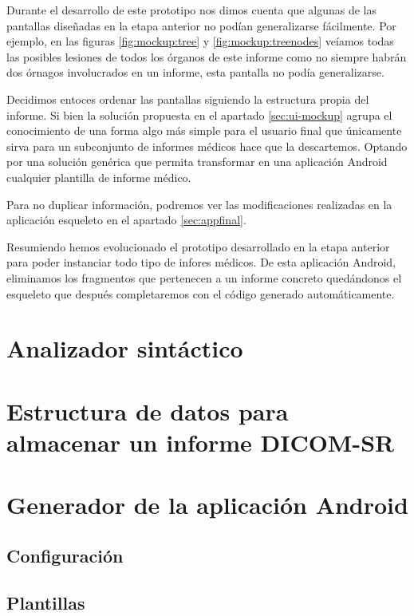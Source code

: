 Durante el desarrollo de este prototipo nos dimos cuenta que algunas de las pantallas diseñadas en la etapa anterior no podían generalizarse fácilmente. Por ejemplo, en las figuras  \ref{fig:mockup:tree} y \ref{fig:mockup:treenodes}  veíamos todas las posibles lesiones de todos los órganos de este informe como no siempre habrán dos órnagos involucrados en un informe, esta pantalla no podía generalizarse.\par
Decidimos entoces ordenar las pantallas siguiendo la estructura propia del informe. Si bien la solución propuesta en el apartado \ref{sec:ui-mockup} agrupa el conocimiento de una forma algo más simple para el usuario final que únicamente sirva para un subconjunto de informes médicos hace que la descartemos. Optando por una solución genérica que permita transformar en una aplicación Android cualquier plantilla de informe médico.\medskip\par  

Para no duplicar información, podremos ver las modificaciones realizadas en la aplicación esqueleto en el apartado \ref{sec:appfinal}.\par
Resumiendo hemos evolucionado el prototipo desarrollado en la etapa anterior para poder instanciar todo tipo de infores médicos. De esta aplicación Android, eliminamos los fragmentos que pertenecen a un informe concreto quedándonos el esqueleto que después completaremos con el código generado automáticamente. 


\section{Analizador sintáctico}

\section{Estructura de datos para almacenar un informe DICOM-SR}

\section{Generador de la aplicación Android}
\subsection{Configuración}\label{sec:configuracion}
\subsection{Plantillas}\label{sec:templates}
